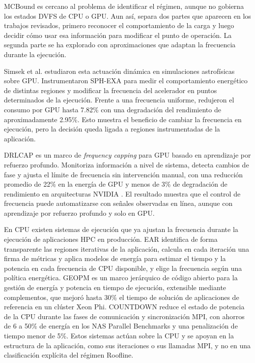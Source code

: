MCBound es cercano al problema de identificar el régimen, aunque no gobierna los estados DVFS de CPU o GPU. Aun así, separa dos partes que aparecen en los trabajos revisados, primero reconocer el comportamiento de la carga y luego decidir cómo usar esa información para modificar el punto de operación. La segunda parte se ha explorado con aproximaciones que adaptan la frecuencia durante la ejecución.

Simsek et al. \cite{Simsek2024} estudiaron esta actuación dinámica en simulaciones astrofísicas sobre GPU. Instrumentaron SPH-EXA para medir el comportamiento energético de distintas regiones y modificar la frecuencia del acelerador en puntos determinados de la ejecución. Frente a una frecuencia uniforme, redujeron el consumo por GPU hasta 7.82\% con una degradación del rendimiento de aproximadamente 2.95\%. Esto muestra el beneficio de cambiar la frecuencia en ejecución, pero la decisión queda ligada a regiones instrumentadas de la aplicación.

DRLCAP es un marco de \textit{frequency capping} para GPU basado en aprendizaje por refuerzo profundo. Monitoriza información a nivel de sistema, detecta cambios de fase y ajusta el límite de frecuencia sin intervención manual, con una reducción promedio de 22\% en la energía de GPU y menos de 3\% de degradación de rendimiento en arquitecturas NVIDIA \cite{Wang2024}. El resultado muestra que el control de frecuencia puede automatizarse con señales observadas en línea, aunque con aprendizaje por refuerzo profundo y solo en GPU.

En CPU existen sistemas de ejecución que ya ajustan la frecuencia durante la ejecución de aplicaciones HPC en producción. EAR \cite{Corbalan2020} identifica de forma transparente las regiones iterativas de la aplicación, calcula en cada iteración una firma de métricas y aplica modelos de energía para estimar el tiempo y la potencia en cada frecuencia de CPU disponible, y elige la frecuencia según una política energética. GEOPM \cite{Eastep2017} es un marco jerárquico de código abierto para la gestión de energía y potencia en tiempo de ejecución, extensible mediante complementos, que mejoró hasta 30\% el tiempo de solución de aplicaciones de referencia en un clúster Xeon Phi. COUNTDOWN \cite{Cesarini2021} reduce el estado de potencia de la CPU durante las fases de comunicación y sincronización MPI, con ahorros de 6 a 50\% de energía en los NAS Parallel Benchmarks y una penalización de tiempo menor de 5\%. Estos sistemas actúan sobre la CPU y se apoyan en la estructura de la aplicación, como sus iteraciones o sus llamadas MPI, y no en una clasificación explícita del régimen Roofline.

